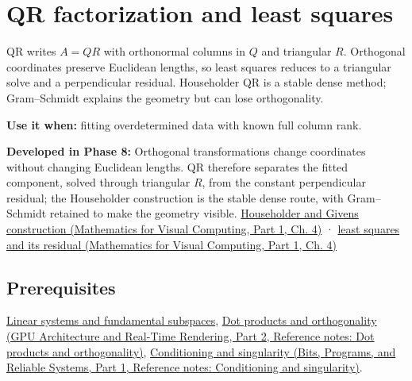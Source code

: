 \hypertarget{appendix-c3421e6b4f2c}{}\label{referencestart:appendix-c3421e6b4f2c}
\section{QR factorization and least squares}\label{appendix-c3421e6b4f2c-qr-factorization-and-least-squares}

\hypertarget{appendix-c3421e6b4f2c-qr-factorization-and-least-squares}{}

QR writes \(A=QR\) with orthonormal columns in \(Q\) and triangular \(R\). Orthogonal coordinates preserve Euclidean lengths, so least squares reduces to a triangular solve and a perpendicular residual. Householder QR is a stable dense method; Gram--Schmidt explains the geometry but can lose orthogonality.

\textbf{Use it when:} fitting overdetermined data with known full column rank.

\textbf{Developed in Phase 8:} Orthogonal transformations change coordinates without changing Euclidean lengths. QR therefore separates the fitted component, solved through triangular \(R\), from the constant perpendicular residual; the Householder construction is the stable dense route, with Gram--Schmidt retained to make the geometry visible. \href{../02-Mathematics-for-Visual-Computing-P01/main.pdf\#01-foundations-i-ch020-reflections-and-plane-rotations-build-qr-without-losing-lengths}{Householder and Givens construction (Mathematics for Visual Computing, Part 1, Ch. 4)} · \href{../02-Mathematics-for-Visual-Computing-P01/main.pdf\#01-foundations-i-ch020-qr-turns-least-squares-into-a-triangular-solve-plus-an-irreducible-residual}{least squares and its residual (Mathematics for Visual Computing, Part 1, Ch. 4)}

\subsection{Prerequisites}\label{appendix-c3421e6b4f2c-prerequisites}

\hypertarget{appendix-c3421e6b4f2c-prerequisites}{}

\hyperref[appendix-8572a4a060c1]{Linear systems and fundamental subspaces}, \href{../06-GPU-Architecture-and-Real-Time-Rendering-P02/main.pdf\#appendix-8bc4e8fc547c}{Dot products and orthogonality (GPU Architecture and Real-Time Rendering, Part 2, Reference notes: Dot products and orthogonality)}, \href{../01-Bits-Programs-and-Reliable-Systems-P01/main.pdf\#appendix-8f6a01f284a7}{Conditioning and singularity (Bits, Programs, and Reliable Systems, Part 1, Reference notes: Conditioning and singularity)}.

